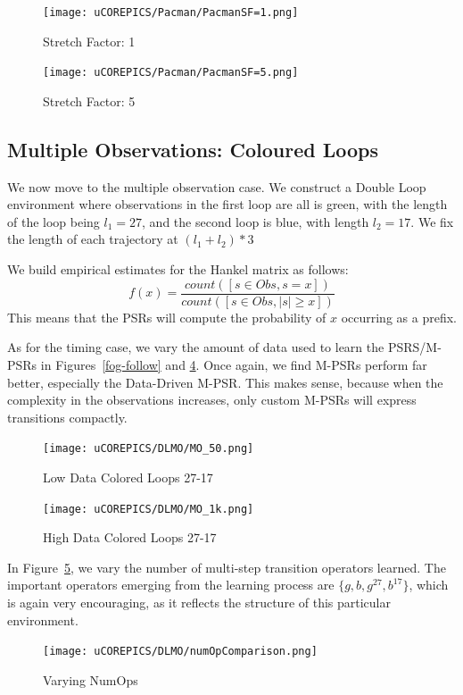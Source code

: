 \begin{figure}[ht!]
\centering
\texttt{[image: uCOREPICS/Pacman/PacmanSF=1.png]}
\caption{Stretch Factor: 1\label{fig-pacsf1}}
\end{figure}

\begin{figure}[ht!]
\centering
\texttt{[image: uCOREPICS/Pacman/PacmanSF=5.png]}
\caption{Stretch Factor: 5\label{fig-pacsf5}}
\end{figure}

\subsection{Multiple Observations: Coloured Loops}

We now move to the multiple observation case. We construct a Double Loop environment where observations in the first loop are all is green, with the length of the loop being $l_1=27$, and the second loop is blue, with length $l_2=17$. We fix the length of each trajectory at 
$(l_1 + l_2)*3$

We build empirical estimates for the Hankel matrix as follows:
\begin{equation*}
 f(x)=\dfrac{count([s \in Obs, s=x])}{count([s \in Obs, |s| \geq x])}
\end{equation*}  
This means that the PSRs will compute the probability of $x$ occurring as a prefix.


As for the timing case, we vary the amount of data used to  learn the PSRS/M-PSRs in Figures~\ref{fog-follow} and \ref{fig-colhigh}. Once again, we find M-PSRs perform far better, especially the Data-Driven M-PSR. This makes sense, because when the complexity in the observations increases, only custom M-PSRs will express transitions compactly.


\begin{figure}[ht!]
\centering
\texttt{[image: uCOREPICS/DLMO/MO\_50.png]}
\caption{Low Data Colored Loops 27-17\label{fig-collow}}
\end{figure}

\begin{figure}[ht!]
\centering
\texttt{[image: uCOREPICS/DLMO/MO\_1k.png]}
\caption{High Data Colored Loops 27-17\label{fig-colhigh}}
\end{figure}



In Figure~\ref{fig-colnumops}, we vary the number of multi-step transition operators learned. The important operators emerging from the learning process are $\{g,b,g^{27},b^{17}\}$, which is again very encouraging, as it reflects the structure of this particular environment.

\begin{figure}[ht!]
\centering
\texttt{[image: uCOREPICS/DLMO/numOpComparison.png]}
\caption{Varying NumOps\label{fig-colnumops}}
\end{figure}
